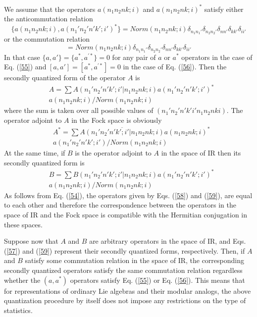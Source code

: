 \documentclass[a4paper,12pt]{article}%
\begin{document}
We assume that the operators $a(n_1n_2nk;i)$ and $a(n_1n_2nk;i)^*$
satisfy either the anticommutation relation
\begin{equation}
\{a(n_1n_2nk;i),a(n_1'n_2'n'k';i')^*\}=Norm(n_1n_2nk;i) \delta_{n_1n_1'} 
\delta_{n_2n_2'} \delta_{nn'} \delta_{kk'} \delta_{ii'}
\label{55}
\end{equation}
or the commutation relation
\begin{equation}
[a(n_1n_2nk;i),a(n_1'n_2'n'k';i')^*]=Norm(n_1n_2nk;i) \delta_{n_1n_1'} 
\delta_{n_2n_2'} \delta_{nn'} \delta_{kk'} \delta_{ii'}
\label{56}
\end{equation}
In that case $\{a,a'\}=\{a^*,a^{'*}\}=0$ for any pair of
$a$ or $a^*$ operators in the case of Eq. (\ref{55}) and
$[a,a']=[a^*,a^{'*}]=0$ in the case of Eq. (\ref{56}).
Then the secondly quantized form of the operator $A$ is
\begin{eqnarray}
&A=\sum A(n_1'n_2'n'k';i'|n_1n_2nk;i)a(n_1'n_2'n'k';i')^*\nonumber\\
&a(n_1n_2nk;i)/Norm(n_1n_2nk;i)
\label{57}
\end{eqnarray}
where the sum is taken over all possible values of 
$(n_1'n_2'n'k'i'n_1n_2nki)$. The operator adjoint to $A$ in
the Fock space is obviously
\begin{eqnarray}
&A^*=\sum \overline{A(n_1'n_2'n'k';i'|n_1n_2nk;i)}
a(n_1n_2nk;i)^*\nonumber\\
&a(n_1'n_2'n'k';i')/Norm(n_1n_2nk;i)
\label{58}
\end{eqnarray}
At the same time, if $B$ is the operator adjoint to $A$ in
the space of IR then its secondly quantized form is
\begin{eqnarray}
&B=\sum B(n_1'n_2'n'k';i'|n_1n_2nk;i)a(n_1'n_2'n'k';i')^*\nonumber\\
&a(n_1n_2nk;i)/Norm(n_1n_2nk;i)
\label{59}
\end{eqnarray}
As follows from Eq. (\ref{54}), the operators given by
Eqs. (\ref{58}) and (\ref{59}), are equal to each other
and therefore the correspondence between the operators
in the space of IR and the Fock space is compatible with the
Hermitian conjugation in these spaces.

Suppose now that $A$ and $B$ are arbitrary
operators in the space of IR, and Eqs. (\ref{57}) and
(\ref{59}) represent their secondly quantized forms,
respectively. Then, if $A$ and $B$ satisfy some commutation
relation in the space of IR, the corresponding secondly 
quantized operators satisfy the same commutation relation
regardless whether the $(a,a^*)$ operators satisfy
Eq. (\ref{55}) or Eq. (\ref{56}). This means that for
representations of ordinary Lie algebras and their
modular analogs, the above quantization procedure by
itself does not impose any restrictions on the type of
statistics.
\end{document}
